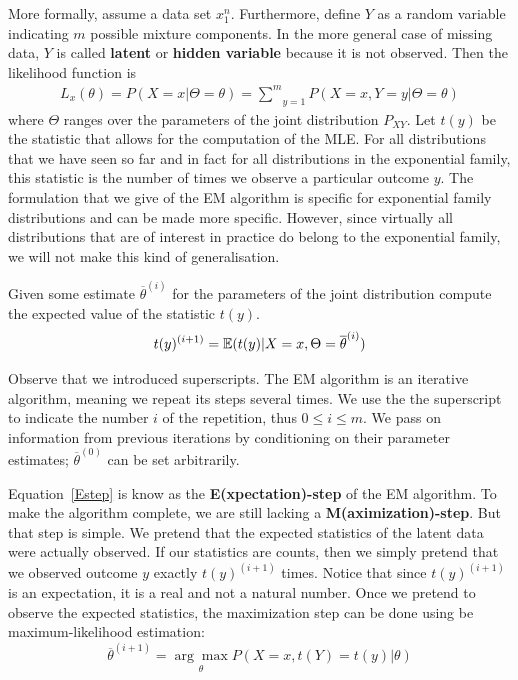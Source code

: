 More formally, assume a data set $ x_{1}^{n} $. Furthermore, define $ Y $ as a random variable indicating $ m $ possible
mixture components. In the more general case of missing data, $ Y $ is called \textbf{latent} or \textbf{hidden variable}
because it is not observed. Then the likelihood function is 
\begin{align}
L_{x}(\theta) = P(X=x|\Theta=\theta) = \underset{y=1}{\overset{m}{\sum}} P(X=x, Y=y|\Theta=\theta)
\end{align}
where $ \Theta $ ranges over the parameters of the joint distribution $ P_{XY} $. Let $ t(y) $ be the
statistic that allows for the computation of the MLE. For all distributions that we have seen so far and in fact for all
distributions in the exponential family, this statistic is the number of times we observe a particular outcome $ y $. The formulation
that we give of the EM algorithm is specific for exponential family distributions and can be made more specific. However, since virtually
all distributions that are of interest in practice do belong to the exponential family, we will not make this kind of generalisation.

Given some estimate $ \overline{\theta}^{(i)} $ for the parameters of the joint
distribution compute the expected value of the statistic $ t(y) $.
\begin{equation} \label{Estep}
t(y)^{(i+1)} = \mathbb{E}(t(y)|X = x,\Theta = \overline{\theta}^{(i)})
\end{equation} 

Observe that we introduced superscripts. The EM algorithm is an iterative algorithm, meaning we repeat its steps several
times. We use the the superscript to indicate the number $i$ of the repetition, thus $ 0 \leq i \leq m $. We pass on
information from previous iterations by conditioning on their parameter estimates; $ \overline{\theta}^{(0)} $ can be set arbitrarily.

Equation~\eqref{Estep} is know as the \textbf{E(xpectation)-step} of the EM algorithm. To make the algorithm complete, we are still lacking a
\textbf{M(aximization)-step}. But that step is simple. We pretend that the expected statistics of the latent data were actually observed. If
our statistics are counts, then we simply pretend that we observed outcome $ y $ exactly $ t(y)^{(i+1)} $ times. Notice that since $ t(y)^{(i+1)} $
is an expectation, it is a real and not a natural number. Once we pretend to observe the expected statistics, the maximization step can be done
using be maximum-likelihood estimation:
\begin{equation} \label{Mstep}
\overline{\theta}^{(i+1)} = \underset{\theta}{\arg\max} P(X=x, t(Y) = t(y)|\theta)
\end{equation}

